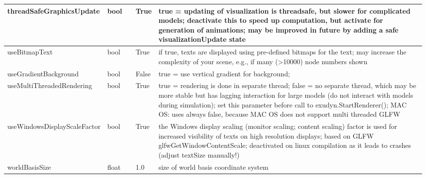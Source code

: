 \begin{center}
\begin{longtable}{| p{4.2cm} | p{2.5cm} | p{0.3cm} | p{3.0cm} | p{6cm} |}
    threadSafeGraphicsUpdate &     bool &      &     True &     true = updating of visualization is threadsafe, but slower for complicated models; deactivate this to speed up computation, but activate for generation of animations; may be improved in future by adding a safe visualizationUpdate state\\ \hline
    useBitmapText &     bool &      &     True &     if true, texts are displayed using pre-defined bitmaps for the text; may increase the complexity of your scene, e.g., if many (>10000) node numbers shown\\ \hline
    useGradientBackground &     bool &      &     False &     true = use vertical gradient for background; \\ \hline
    useMultiThreadedRendering &     bool &      &     True &     true = rendering is done in separate thread; false = no separate thread, which may be more stable but has lagging interaction for large models (do not interact with models during simulation); set this parameter before call to exudyn.StartRenderer(); MAC OS: uses always false, because MAC OS does not support multi threaded GLFW\\ \hline
    useWindowsDisplayScaleFactor &     bool &      &     True &     the Windows display scaling (monitor scaling; content scaling) factor is used for increased visibility of texts on high resolution displays; based on GLFW glfwGetWindowContentScale; deactivated on linux compilation as it leads to crashes (adjust textSize manually!)\\ \hline
    worldBasisSize &     float &      &     1.0 &     size of world basis coordinate system\\ \hline
	  \end{longtable}
	\end{center}

